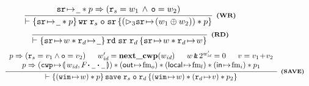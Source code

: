 \begin{figure*}[!thp]
{\begin{minipage}{1\linewidth}
			\[
				\infer[\tinybftext{(WR)}]
				{
					\wfins{\regst{\sr}{\notCare} * p}{\cwr \; \reg{s} \; \oexp \; \sr}
					{(\dlyregst{3}{\sr}{(\word_1 \xorOP \word_2)} ) * p}
				}
				{
					\regst{\sr}{\notCare} * p \Rightarrow (\reg{s} = \word_1 \, \wedge \, \oexp = \word_2)
				}
			\]
            \[
                \infer[\tinybftext{(RD)}]
                {
                    \wfins{\regst{\sr}{\word} * \regst{\reg{d}}{\notCare}}{\rd \; \sr \; \reg{d}}
                    {\regst{\sr}{\word} * \regst{\reg{d}}{\word}}
                }
                {}
            \]
%
%
			\[\begin{array}{l}
				\infer[\tinybftext{(SAVE)}]
				{
					\wfins{(\regst{\regwim}{\word}) * p}
					{\csave \; \reg{s} \; \oexp \; \reg{d}}
					{(\regst{\regwim}{\word}) * 
					(\regst{\reg{d}}{\val}) * p_2}
				}
				{
					\begin{array}{c}
						p \Rightarrow (\reg{s} = \val_1 \wedge \oexp = \val_2) \quad \; \;
						\cwp' = \precwp(\cwp) \quad \; \;
						\word \,\bitAND\, 2^{\cwp'} = 0 \quad \; \;
						\val = \val_1\!+\!\val_2 \\
						p \Rightarrow
						\left(\frmst{\cwp}{\Wstack \lstApp \, \notCare \, \lstApp \, \notCare}\right) *
						(\OutRegs{\fm_o}) *
                        (\LocalRegs{\fm_l}) *
                        (\InRegs{\fm_i})
                        * p_1 \\

\end{array}}
\end{array}\]
\end{minipage}}
\end{figure*}
